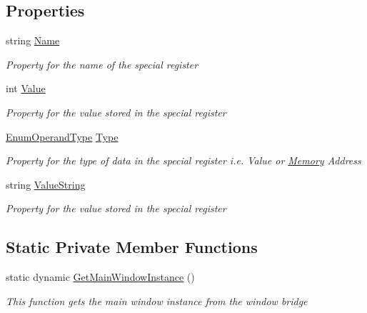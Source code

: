 \subsection*{Properties}
\begin{DoxyCompactItemize}
\item 
string \hyperlink{class_c_p_u___o_s___simulator_1_1_c_p_u_1_1_special_register_ad8ad1efaf680db5471184a74f911b558}{Name}
\begin{DoxyCompactList}\small\item\em Property for the name of the special register \end{DoxyCompactList}\item 
int \hyperlink{class_c_p_u___o_s___simulator_1_1_c_p_u_1_1_special_register_aeff33618d376eeaef1e62d6833074bd4}{Value}
\begin{DoxyCompactList}\small\item\em Property for the value stored in the special register \end{DoxyCompactList}\item 
\hyperlink{namespace_c_p_u___o_s___simulator_1_1_c_p_u_ad49cfe442b74115a326c03b7ae848f76}{Enum\+Operand\+Type} \hyperlink{class_c_p_u___o_s___simulator_1_1_c_p_u_1_1_special_register_afd9e45080d792861e577dde31cdb6d3e}{Type}
\begin{DoxyCompactList}\small\item\em Property for the type of data in the special register i.\+e. Value or \hyperlink{namespace_c_p_u___o_s___simulator_1_1_memory}{Memory} Address \end{DoxyCompactList}\item 
string \hyperlink{class_c_p_u___o_s___simulator_1_1_c_p_u_1_1_special_register_a60a2bcd516cedf8bb485c2e36bbc3235}{Value\+String}
\begin{DoxyCompactList}\small\item\em Property for the value stored in the special register \end{DoxyCompactList}\end{DoxyCompactItemize}
\subsection*{Static Private Member Functions}
\begin{DoxyCompactItemize}
\item 
static dynamic \hyperlink{class_c_p_u___o_s___simulator_1_1_c_p_u_1_1_special_register_a0ed54c8fcd7674bcb87fef3eda712af2}{Get\+Main\+Window\+Instance} ()
\begin{DoxyCompactList}\small\item\em This function gets the main window instance from the window bridge \end{DoxyCompactList}\end{DoxyCompactItemize}
